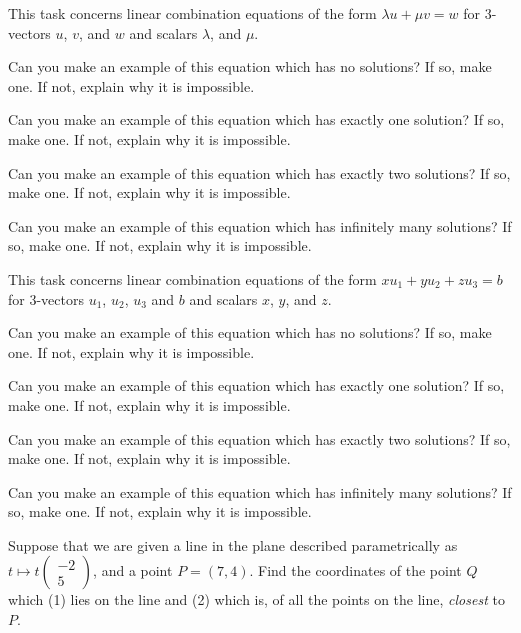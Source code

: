 \documentclass[cahier-main.tex]{subfiles}
\begin{document}
\begin{task}
This task concerns linear combination equations of the form $\lambda u +\mu v=w$ for $3$-vectors $u$, $v$, and $w$ and scalars $\lambda$, and $\mu$.
\begin{compactitem}
\item Can you make an example of this equation which has no solutions? If so, make one. If not, explain why it is impossible.
\item Can you make an example of this equation which has exactly one solution? If so, make one. If not, explain why it is impossible.
\item Can you make an example of this equation which has exactly two solutions?  If so, make one. If not, explain why it is impossible.
\item Can you make an example of this equation which has infinitely many solutions? If so, make one. If not, explain why it is impossible.
\end{compactitem}
\end{task}

\begin{task}
This task concerns linear combination equations of the form $x u_1 + y u_2 + z u_3 = b$ for $3$-vectors $u_1$, $u_2$, $u_3$ and $b$ and scalars $x$, $y$, and $z$.
\begin{compactitem}
\item Can you make an example of this equation which has no solutions? If so, make one. If not, explain why it is impossible.
\item Can you make an example of this equation which has exactly one solution? If so, make one. If not, explain why it is impossible.
\item Can you make an example of this equation which has exactly two solutions?  If so, make one. If not, explain why it is impossible.
\item Can you make an example of this equation which has infinitely many solutions? If so, make one. If not, explain why it is impossible.
\end{compactitem}
\end{task}

\begin{challenge}
Suppose that we are given a line in the plane described parametrically as 
$t \mapsto t\left(\begin{smallmatrix} -2 \\ 5\end{smallmatrix}\right)$,
and a point $P = (7,4)$. Find the coordinates of the point $Q$ which (1) lies on the line and (2) which is, of all the points on the line, \emph{closest} to $P$.
\end{challenge}
\end{document}
